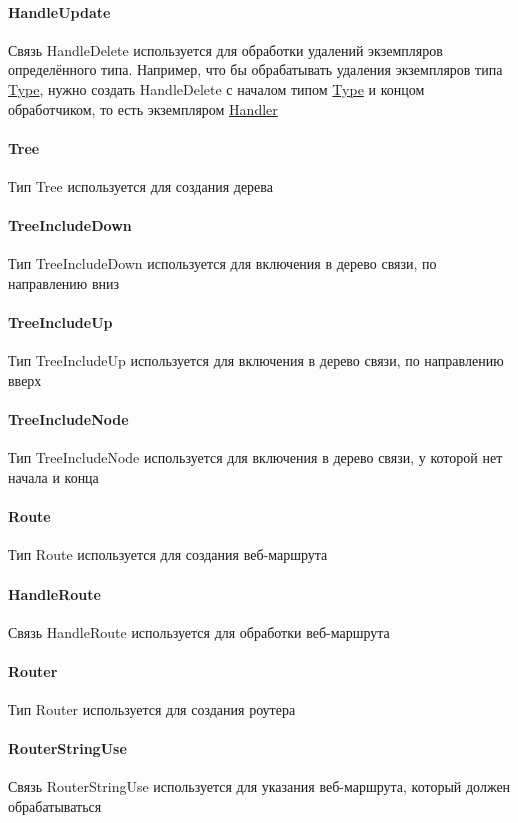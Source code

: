 \documentclass{article}
\begin{document}
\paragraph*{HandleUpdate}
Связь HandleDelete\hypertarget{HandleDelete.Def}{} используется для обработки
удалений экземпляров определённого типа. Например, что бы обрабатывать удаления
экземпляров типа \hyperlink{type.Def}{Type}, нужно создать HandleDelete с
началом типом \hyperlink{type.Def}{Type} и концом обработчиком, то есть
экземпляром \hyperlink{handler.Def}{Handler}
\paragraph*{Tree}
Тип Tree\hypertarget{Tree.Def}{} используется для создания дерева
\paragraph*{TreeIncludeDown}
Тип TreeIncludeDown\hypertarget{TreeIncludeDown.Def}{} используется для включения в дерево связи, по направлению вниз
\paragraph*{TreeIncludeUp}
Тип TreeIncludeUp\hypertarget{TreeIncludeUp.Def}{} используется для включения в дерево связи, по направлению вверх
\paragraph*{TreeIncludeNode}
Тип TreeIncludeNode\hypertarget{TreeIncludeNode.Def}{} используется для включения в дерево связи, у которой нет начала и конца
\paragraph*{Route}
Тип Route\hypertarget{Route.Def}{} используется для создания веб-маршрута
\paragraph*{HandleRoute}
Связь HandleRoute\hypertarget{HandleRoute.Def}{} используется для обработки веб-маршрута

\paragraph*{Router}
Тип Router\hypertarget{Router.Def}{} используется для создания роутера
\paragraph*{RouterStringUse}  
Связь RouterStringUse\hypertarget{RouterStringUse.Def}{} используется для указания веб-маршрута, который должен обрабатываться
\end{document}
